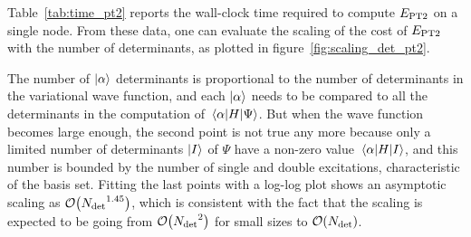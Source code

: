 \documentclass[./thesis.tex]{subfiles}
\begin{document}
Table~\ref{tab:time_pt2} reports the wall-clock time required to compute $E_\text{PT2}$
on a single node.
From these data, one can evaluate the scaling of the cost of $E_\text{PT2}$ 
with the number of determinants, as plotted in figure~\ref{fig:scaling_det_pt2}.

The number of $\ket{\alpha}$ determinants is proportional to the
number of determinants in the variational wave function, and each
$\ket{\alpha}$ needs to be compared to all the determinants 
in the computation of $\mel{\alpha}{H}{\Psi}$.
But when the wave function becomes large enough, the second point is not true any more because only a limited number of determinants $\ket{I}$ of $\Psi$ have a non-zero
value $\mel{\alpha}{H}{I}$, and this number is bounded by the number of single and double excitations, characteristic of the basis set.
Fitting the last points with a log-log plot shows an asymptotic scaling as
$\order{\Ndet^{1.45}}$, which is consistent with the fact that the scaling is
expected to be going from $\order{\Ndet^2}$ for small sizes to $\order{\Ndet}$.
\end{document}
